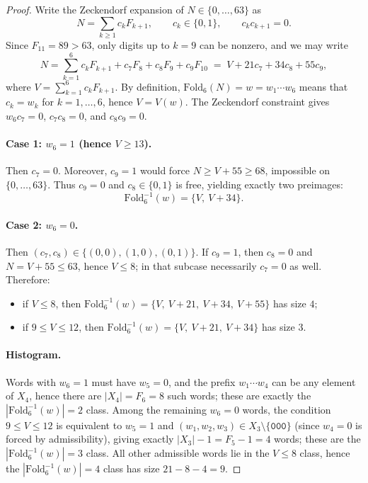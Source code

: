 \begin{proof}
Write the Zeckendorf expansion of $N\in\{0,\dots,63\}$ as
\[
N=\sum_{k\ge 1} c_k F_{k+1},
\qquad c_k\in\{0,1\},\qquad c_kc_{k+1}=0.
\]
Since $F_{11}=89>63$, only digits up to $k=9$ can be nonzero, and we may write
\[
N=\sum_{k=1}^{6} c_k F_{k+1} + c_7F_8+c_8F_9+c_9F_{10}
\;=\; V + 21c_7+34c_8+55c_9,
\]
where $V=\sum_{k=1}^6 c_kF_{k+1}$.
By definition, $\mathrm{Fold}_6(N)=w=w_1\cdots w_6$ means that $c_k=w_k$ for $k=1,\dots,6$, hence $V=V(w)$.
The Zeckendorf constraint gives $w_6c_7=0$, $c_7c_8=0$, and $c_8c_9=0$.

\paragraph{Case 1: $w_6=1$ (hence $V\ge 13$).}
Then $c_7=0$.
Moreover, $c_9=1$ would force $N\ge V+55\ge 68$, impossible on $\{0,\dots,63\}$.
Thus $c_9=0$ and $c_8\in\{0,1\}$ is free, yielding exactly two preimages:
\[
\mathrm{Fold}_6^{-1}(w)=\{V,\ V+34\}.
\]

\paragraph{Case 2: $w_6=0$.}
Then $(c_7,c_8)\in\{(0,0),(1,0),(0,1)\}$.
If $c_9=1$, then $c_8=0$ and $N=V+55\le 63$, hence $V\le 8$; in that subcase necessarily $c_7=0$ as well.
Therefore:
\begin{itemize}
\item if $V\le 8$, then $\mathrm{Fold}_6^{-1}(w)=\{V,\ V+21,\ V+34,\ V+55\}$ has size $4$;
\item if $9\le V\le 12$, then $\mathrm{Fold}_6^{-1}(w)=\{V,\ V+21,\ V+34\}$ has size $3$.
\end{itemize}

\paragraph{Histogram.}
Words with $w_6=1$ must have $w_5=0$, and the prefix $w_1\cdots w_4$ can be any element of $X_4$, hence there are $|X_4|=F_6=8$ such words; these are exactly the $|\mathrm{Fold}_6^{-1}(w)|=2$ class.
Among the remaining $w_6=0$ words, the condition $9\le V\le 12$ is equivalent to $w_5=1$ and $(w_1,w_2,w_3)\in X_3\setminus\{\texttt{000}\}$ (since $w_4=0$ is forced by admissibility), giving exactly $|X_3|-1=F_5-1=4$ words; these are the $|\mathrm{Fold}_6^{-1}(w)|=3$ class.
All other admissible words lie in the $V\le 8$ class, hence the $|\mathrm{Fold}_6^{-1}(w)|=4$ class has size $21-8-4=9$.
\end{proof}

